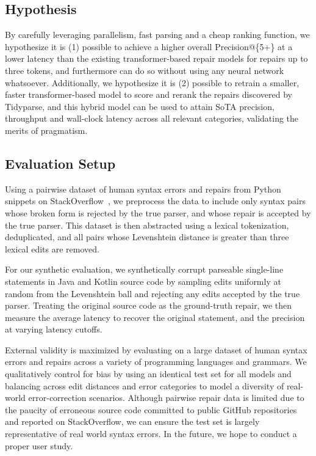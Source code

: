 \documentclass[sigplan,screen]{acmart}
\begin{document}
\subsection{Hypothesis}


By carefully leveraging parallelism, fast parsing and a cheap ranking function, we hypothesize it is (1) possible to achieve a higher overall Precision@\{5+\} at a lower latency than the existing transformer-based repair models for repairs up to three tokens, and furthermore can do so without using any neural network whatsoever. Additionally, we hypothesize it is (2) possible to retrain a smaller, faster transformer-based model to score and rerank the repairs discovered by Tidyparse, and this hybrid model can be used to attain SoTA precision, throughput and wall-clock latency across all relevant categories, validating the merits of pragmatism.

\subsection{Evaluation Setup}


Using a pairwise dataset of human syntax errors and repairs from Python snippets on StackOverflow~\cite{wong2019syntax}, we preprocess the data to include only syntax pairs whose broken form is rejected by the true parser, and whose repair is accepted by the true parser. This dataset is then abstracted using a lexical tokenization, deduplicated, and all pairs whose Levenshtein distance is greater than three lexical edits are removed.

For our synthetic evaluation, we synthetically corrupt parseable single-line statements in Java and Kotlin source code by sampling edits uniformly at random from the Levenshtein ball and rejecting any edits accepted by the true parser. Treating the original source code as the ground-truth repair, we then measure the average latency to recover the original statement, and the precision at varying latency cutoffs.

External validity is maximized by evaluating on a large dataset of human syntax errors and repairs across a variety of programming languages and grammars. We qualitatively control for bias by using an identical test set for all models and balancing across edit distances and error categories to model a diversity of real-world error-correction scenarios. Although pairwise repair data is limited due to the paucity of erroneous source code committed to public GitHub repositories and reported on StackOverflow, we can ensure the test set is largely representative of real world syntax errors. In the future, we hope to conduct a proper user study.



\end{document}
